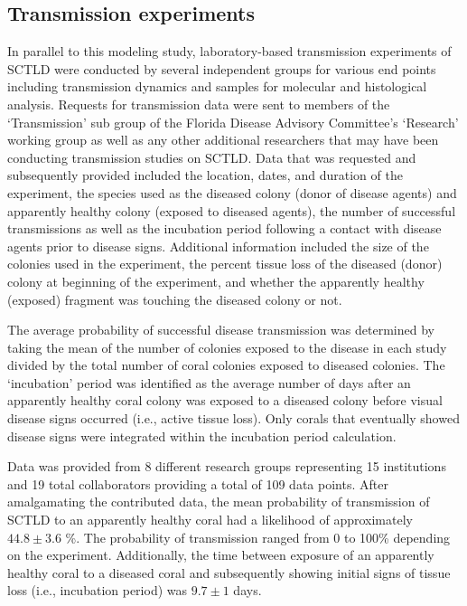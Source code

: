 \documentclass[utf8]{frontiersSCNS}
\begin{document}
\subsection{Transmission experiments}
In parallel to this modeling study, laboratory-based transmission experiments of SCTLD were conducted by several independent groups for various end points including transmission dynamics and samples for molecular and histological analysis. Requests for transmission data were sent to members of the ‘Transmission’ sub group of the Florida Disease Advisory Committee’s ‘Research’ working group as well as any other additional researchers that may have been conducting transmission studies on SCTLD. Data that was requested and subsequently provided included the location, dates, and duration of the experiment, the species used as the diseased colony (donor of disease agents) and apparently healthy colony (exposed to diseased agents), the number of successful transmissions as well as the incubation period following a contact with disease agents prior to disease signs. Additional information included the size of the colonies used in the experiment, the percent tissue loss of the diseased (donor) colony at beginning of the experiment, and whether the apparently healthy (exposed) fragment was touching the diseased colony or not. 

The average probability of successful disease transmission was determined by taking the mean of the number of colonies exposed to the disease in each study divided by the total number of coral colonies exposed to diseased colonies. The ‘incubation’ period was identified as the average number of days after an apparently healthy coral colony was exposed to a diseased colony before visual disease signs occurred (i.e., active tissue loss). Only corals that eventually showed disease signs were integrated within the incubation period calculation. 

Data was provided from 8 different research groups representing 15 institutions and 19 total collaborators providing a total of 109 data points. After amalgamating the contributed data, the mean probability of transmission of SCTLD to an apparently healthy coral had a likelihood of approximately $44.8 \pm 3.6$ \%. The probability of transmission ranged from 0 to 100\% depending on the experiment. Additionally, the time between exposure of an apparently healthy coral to a diseased coral and subsequently showing initial signs of tissue loss (i.e., incubation period) was $9.7 \pm 1$ days.  
\end{document}

